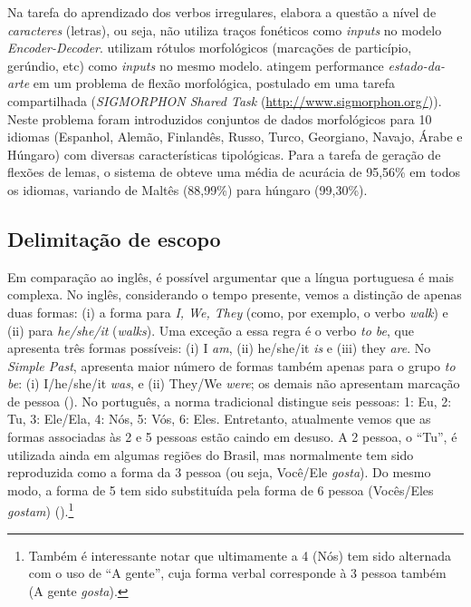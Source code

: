 Na tarefa do aprendizado dos verbos irregulares, \cite{faruqui:2015} elabora a questão a nível de \textit{caracteres} (letras), ou seja, não utiliza traços fonéticos como \textit{inputs} no modelo \textit{Encoder-Decoder}. \cite{kann-schutze-2016-med} utilizam rótulos morfológicos (marcações de particípio, gerúndio, etc) como \textit{inputs} no mesmo modelo. \cite{cotterell-sigmorphon2016} atingem performance \textit{estado-da-arte} em um problema de flexão morfológica, postulado em uma tarefa compartilhada (\textit{SIGMORPHON Shared Task} (\url{http://www.sigmorphon.org/})). Neste problema foram introduzidos conjuntos de dados morfológicos para 10 idiomas (Espanhol, Alemão, Finlandês, Russo, Turco, Georgiano, Navajo, Árabe e Húngaro) com diversas características tipológicas. Para a tarefa de geração de flexões de lemas, o sistema de \cite{cotterell-sigmorphon2016} obteve uma média de acurácia de 95,56\% em todos os idiomas, variando de
Maltês (88,99\%) para húngaro (99,30\%).

\subsection{Delimitação de escopo}
\label{sec:escopo}

Em comparação ao inglês, é possível argumentar que a língua portuguesa é mais complexa. No inglês, considerando o tempo presente, vemos a distinção de apenas duas formas: (i) a forma para \textit{I, We, They} (como, por exemplo, o verbo \textit{walk}) e (ii) para \textit{he/she/it }(\textit{walks}). Uma exceção a essa regra é o verbo \textit{to be}, que apresenta três formas possíveis: (i) I \textit{am}, (ii) he/she/it \textit{is} e (iii) they \textit{are}. No \textit{Simple Past}, apresenta maior número de formas também apenas para o grupo \textit{to be}: (i) I/he/she/it \textit{was}, e (ii) They/We \textit{were}; os demais não apresentam marcação de pessoa (\cite{Nelson:2010}). No português, a norma tradicional distingue seis pessoas: 1: Eu, 2: Tu, 3: Ele/Ela, 4: Nós, 5: Vós, 6: Eles. Entretanto, atualmente vemos que as formas associadas às 2 e 5 pessoas estão caindo em desuso. A 2 pessoa, o “Tu”, é utilizada ainda em algumas regiões do Brasil, mas normalmente tem sido reproduzida como a forma da 3 pessoa (ou seja, Você/Ele \textit{gosta}). Do mesmo modo, a forma de 5 tem sido substituída pela forma de 6 pessoa (Vocês/Eles \textit{gostam}) (\cite{1999:camara}).\footnote{Também é interessante notar que ultimamente a 4 (Nós) tem sido alternada com o uso de “A gente”, cuja forma verbal corresponde à 3 pessoa também (A gente \textit{gosta}).}

